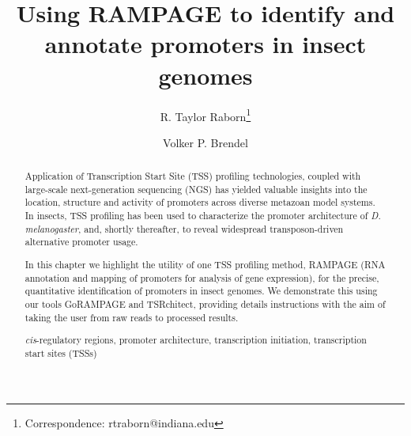 \documentclass[runningheads,a4paper]{llncs}
\newcommand{\keywords}[1]{\par\addvspace\baselineskip
\noindent\keywordname\enspace\ignorespaces#1}
\begin{document}
\mainmatter  %

\title{Using RAMPAGE to identify and annotate promoters in insect genomes}


\author[1,2]{R. Taylor Raborn\thanks{Correspondence: rtraborn@indiana.edu}}
\author[1,2]{Volker P. Brendel}



\renewcommand\Authands{ and }
%


%
%

\maketitle


\begin{abstract}
Application of Transcription Start Site (TSS) profiling technologies, coupled with large-scale next-generation sequencing (NGS) has yielded valuable insights into the location, structure and activity of promoters across diverse metazoan model systems.
In insects, TSS profiling has been used to characterize the promoter architecture of \textit{D. melanogaster}, and, shortly thereafter, to reveal widespread transposon-driven alternative promoter usage. 

In this chapter we highlight the utility of one TSS profiling method, RAMPAGE (RNA annotation and mapping of promoters for analysis of gene expression), for the precise, quantitative identification of promoters in insect genomes.
We demonstrate this using our tools GoRAMPAGE and TSRchitect, providing details instructions with the aim of taking the user from raw reads to processed results. 

\keywords{\textit{cis}-regulatory regions, promoter architecture, transcription initiation, transcription start sites (TSSs)}
\end{abstract}
\end{document}
